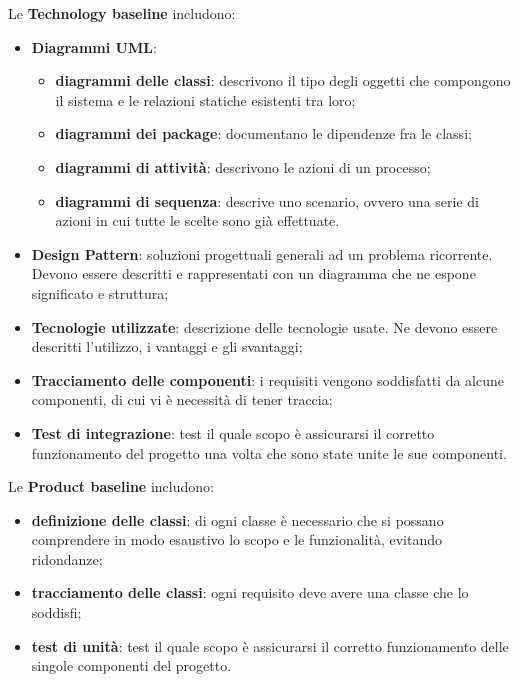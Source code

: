 Le \textbf{Technology baseline} includono:
\begin{itemize}
\item \textbf{Diagrammi UML}:
\begin{itemize}
\item \textbf{diagrammi delle classi}: descrivono il tipo degli oggetti che compongono il sistema e le relazioni statiche esistenti tra loro;
\item \textbf{diagrammi dei package}: documentano le dipendenze fra le classi;
\item \textbf{diagrammi di attività}: descrivono le azioni di un processo;
\item \textbf{diagrammi di sequenza}: descrive uno scenario, ovvero una serie di azioni in cui tutte le scelte sono già effettuate.
\end{itemize}
\item \textbf{Design Pattern}: soluzioni progettuali generali ad un problema ricorrente. Devono essere descritti e rappresentati con un diagramma che ne espone significato e struttura;
\item \textbf{Tecnologie utilizzate}: descrizione delle tecnologie usate. Ne devono essere descritti l'utilizzo, i vantaggi e gli svantaggi;
\item \textbf{Tracciamento delle componenti}: i requisiti vengono soddisfatti da alcune componenti, di cui vi è necessità di tener traccia;
\item \textbf{Test di integrazione}: test il quale scopo è assicurarsi il corretto funzionamento del progetto una volta che sono state unite le sue componenti.
\end{itemize}

Le \textbf{Product baseline} includono:
\begin{itemize}
\item \textbf{definizione delle classi}: di ogni classe è necessario che si possano comprendere in modo esaustivo lo scopo e le funzionalità, evitando ridondanze;
\item \textbf{tracciamento delle classi}: ogni requisito deve avere una classe che lo soddisfi; 
\item \textbf{test di unità}: test il quale scopo è assicurarsi il corretto funzionamento delle singole componenti del progetto.
\end{itemize}